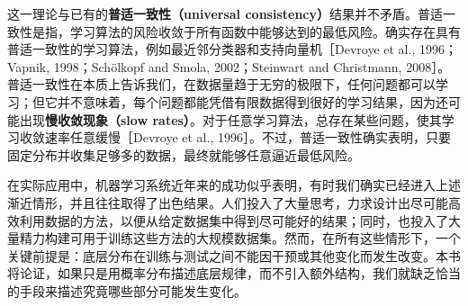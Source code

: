 这一理论与已有的\textbf{普适一致性（universal consistency）}结果并不矛盾。普适一致性是指，学习算法的风险收敛于所有函数中能够达到的最低风险。确实存在具有普适一致性的学习算法，例如最近邻分类器和支持向量机［Devroye et al., 1996；Vapnik, 1998；Schölkopf and Smola, 2002；Steinwart and Christmann, 2008］。普适一致性在本质上告诉我们，在数据量趋于无穷的极限下，任何问题都可以学习；但它并不意味着，每个问题都能凭借有限数据得到很好的学习结果，因为还可能出现\textbf{慢收敛现象（slow rates）}。对于任意学习算法，总存在某些问题，使其学习收敛速率任意缓慢［Devroye et al., 1996］。不过，普适一致性确实表明，只要固定分布并收集足够多的数据，最终就能够任意逼近最低风险。

在实际应用中，机器学习系统近年来的成功似乎表明，有时我们确实已经进入上述渐近情形，并且往往取得了出色结果。人们投入了大量思考，力求设计出尽可能高效利用数据的方法，以便从给定数据集中得到尽可能好的结果；同时，也投入了大量精力构建可用于训练这些方法的大规模数据集。然而，在所有这些情形下，一个关键前提是：底层分布在训练与测试之间不能因干预或其他变化而发生改变。本书将论证，如果只是用概率分布描述底层规律，而不引入额外结构，我们就缺乏恰当的手段来描述究竟哪些部分可能发生变化。
